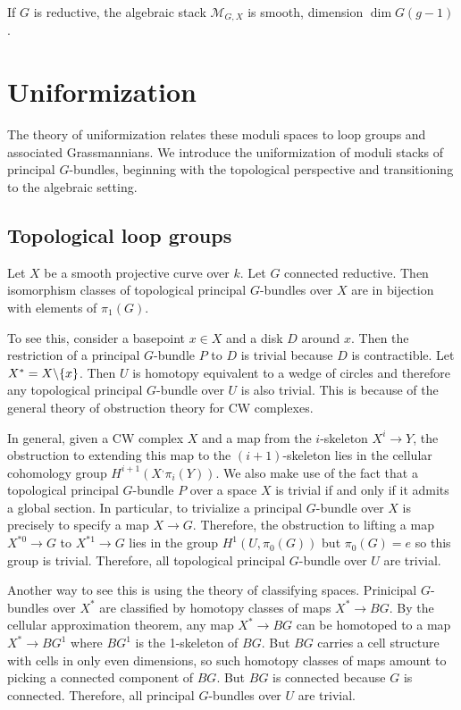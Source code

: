 \documentclass[12pt]{article}
\begin{document}
\begin{proposition}
    If $G$ is reductive, the algebraic stack $\mathcal{M}_{G,X}$ is smooth, dimension $\dim G(g-1)$.
\end{proposition}





\section{Uniformization}
The theory of uniformization relates these moduli spaces to loop groups and associated Grassmannians. We introduce the uniformization of moduli stacks of principal $G$-bundles, beginning with the topological perspective and transitioning to the algebraic setting.
\subsection{Topological loop groups}
Let $X$ be a smooth projective curve over $k$. Let $G$ connected reductive. Then isomorphism classes of topological principal $G$-bundles over $X$ are in bijection with elements of $\pi_1(G)$.

To see this, consider a basepoint $x\in X$ and a disk $D$ around $x$. Then the restriction of a principal $G$-bundle $P$ to $D$ is trivial because $D$ is contractible. Let $X^* = X \backslash \{x\}$. Then $U$ is homotopy equivalent to a wedge of circles and therefore any topological principal $G$-bundle over $U$ is also trivial. This is because of the general theory of obstruction theory for CW complexes.

In general, given a CW complex $X$ and a map from the $i$-skeleton $X^i \to Y$, the obstruction to extending this map to the $(i+1)$-skeleton lies in the cellular cohomology group $H^{i+1}(X^, \pi_i(Y))$. We also make use of the fact that a topological principal $G$-bundle $P$ over a space $X$ is trivial if and only if it admits a global section. In particular, to trivialize a principal $G$-bundle over $X$ is precisely to specify a map $X \to G$. Therefore, the obstruction to lifting a map $X^{*0} \to G$ to $X^{*1} \to G$ lies in the group $H^1(U, \pi_0(G))$ but $\pi_0(G) = e$ so this group is trivial. Therefore, all topological principal $G$-bundle over $U$ are trivial.

Another way to see this is using the theory of classifying spaces. Prinicipal $G$-bundles over $X^*$ are classified by homotopy classes of maps $X^* \to BG$. By the cellular approximation theorem, any map $X^* \to BG$ can be homotoped to a map $X^* \to BG^1$ where $BG^1$ is the 1-skeleton of $BG$. But $BG$ carries a cell structure with cells in only even dimensions, so such homotopy classes of maps amount to picking a connected component of $BG$. But $BG$ is connected because $G$ is connected. Therefore, all principal $G$-bundles over $U$ are trivial.
\end{document}
